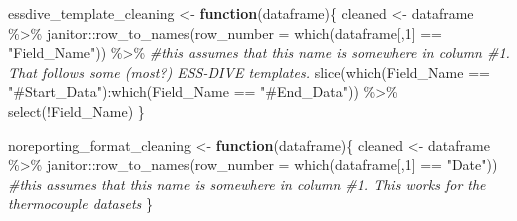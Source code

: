\documentclass[
]{article}
\newenvironment{Shaded}{\begin{snugshade}}{\end{snugshade}}
\newcommand{\AttributeTok}[1]{\textcolor[rgb]{0.77,0.63,0.00}{#1}}
\newcommand{\CommentTok}[1]{\textcolor[rgb]{0.56,0.35,0.01}{\textit{#1}}}
\newcommand{\ControlFlowTok}[1]{\textcolor[rgb]{0.13,0.29,0.53}{\textbf{#1}}}
\newcommand{\DecValTok}[1]{\textcolor[rgb]{0.00,0.00,0.81}{#1}}
\newcommand{\FunctionTok}[1]{\textcolor[rgb]{0.00,0.00,0.00}{#1}}
\newcommand{\NormalTok}[1]{#1}
\newcommand{\OtherTok}[1]{\textcolor[rgb]{0.56,0.35,0.01}{#1}}
\newcommand{\SpecialCharTok}[1]{\textcolor[rgb]{0.00,0.00,0.00}{#1}}
\newcommand{\StringTok}[1]{\textcolor[rgb]{0.31,0.60,0.02}{#1}}
\begin{document}
\begin{Shaded}
\begin{Highlighting}[]
\NormalTok{essdive\_template\_cleaning }\OtherTok{\textless{}{-}} \ControlFlowTok{function}\NormalTok{(dataframe)\{}
\NormalTok{  cleaned }\OtherTok{\textless{}{-}}\NormalTok{ dataframe }\SpecialCharTok{\%\textgreater{}\%} 
\NormalTok{  janitor}\SpecialCharTok{::}\FunctionTok{row\_to\_names}\NormalTok{(}\AttributeTok{row\_number =} \FunctionTok{which}\NormalTok{(dataframe[,}\DecValTok{1}\NormalTok{] }\SpecialCharTok{==} \StringTok{"Field\_Name"}\NormalTok{)) }\SpecialCharTok{\%\textgreater{}\%} \CommentTok{\#this assumes that this name is somewhere in column \#1. That follows some (most?) ESS{-}DIVE templates.}
 \FunctionTok{slice}\NormalTok{(}\FunctionTok{which}\NormalTok{(Field\_Name }\SpecialCharTok{==} \StringTok{"\#Start\_Data"}\NormalTok{)}\SpecialCharTok{:}\FunctionTok{which}\NormalTok{(Field\_Name }\SpecialCharTok{==} \StringTok{"\#End\_Data"}\NormalTok{)) }\SpecialCharTok{\%\textgreater{}\%}
 \FunctionTok{select}\NormalTok{(}\SpecialCharTok{!}\NormalTok{Field\_Name)}
\NormalTok{  \}}

\NormalTok{noreporting\_format\_cleaning }\OtherTok{\textless{}{-}} \ControlFlowTok{function}\NormalTok{(dataframe)\{}
\NormalTok{  cleaned }\OtherTok{\textless{}{-}}\NormalTok{ dataframe }\SpecialCharTok{\%\textgreater{}\%} 
\NormalTok{  janitor}\SpecialCharTok{::}\FunctionTok{row\_to\_names}\NormalTok{(}\AttributeTok{row\_number =} \FunctionTok{which}\NormalTok{(dataframe[,}\DecValTok{1}\NormalTok{] }\SpecialCharTok{==} \StringTok{"Date"}\NormalTok{)) }\CommentTok{\#this assumes that this name is somewhere in column \#1. This works for the thermocouple datasets}
\NormalTok{  \}}
\end{Highlighting}
\end{Shaded}
\end{document}
